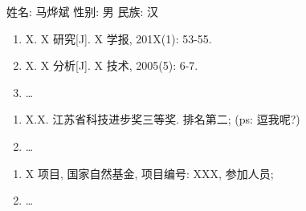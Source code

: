 


姓名: 马烨斌 \quad 性别: 男 \quad 民族: 汉



    \begin{enumerate}
        \item X. X 研究[J]. X 学报, 201X(1): 53-55.
        \item X. X 分析[J]. X 技术, 2005(5): 6-7.
        \item \dots
    \end{enumerate}

    \begin{enumerate}
        \item X.X. 江苏省科技进步奖三等奖. 排名第二; (ps: 逗我呢?)
        \item \dots
    \end{enumerate}

    \begin{enumerate}
        \item X 项目, 国家自然基金, 项目编号: XXX, 参加人员;
        \item \dots
    \end{enumerate}

\endinput
